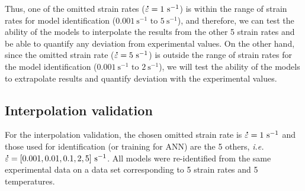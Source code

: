 \documentclass[twoside,english,1p,final,sort&compress]{elsarticle}
\makeatletter
\theoremstyle{plain}
\DeclareRobustCommand{\mdot}[1]{\accentset{\mbox{\bfseries .}}{#1}}
\DeclareRobustCommand{\ie}{\emph{i.e.}\@\xspace}
\DeclareRobustCommand{\ps}{\text{s}^{-1}}
\makeatother
\begin{document}
Thus, one of the omitted strain rates ($\mdot\varepsilon=1~\ps$) is within the range of strain rates for model identification ($0.001~\ps\text{ to }5~\ps$), and therefore, we can test the ability of the models to interpolate the results from the other 5 strain rates and be able to quantify any deviation from experimental values.
On the other hand, since the omitted strain rate ($\mdot\varepsilon=5~\ps$) is outside the range of strain rates for the model identification ($0.001~\ps\text{ to }2~\ps$), we will test the ability of the models to extrapolate results and quantify deviation with the experimental values.

\subsection{Interpolation validation}

For the interpolation validation, the chosen omitted strain rate is $\mdot\varepsilon=1~\ps$ and those used for identification (or training for ANN) are the 5 others, \ie $\mdot\varepsilon=[0.001, 0.01, 0.1, 2, 5]~\ps$. All models were re-identified from the same experimental data on a data set corresponding to 5 strain rates and 5 temperatures.
\end{document}
